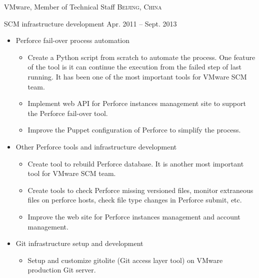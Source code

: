\documentclass[10pt,letterpaper]{article}
\begin{document}
\headedsection
{VMware, Member of Technical Staff}
{\textsc{Beijing, China}}{

\headedsubsection %
{SCM infrastructure development} {Apr. 2011 -- Sept. 2013}
{
    \begin{itemize}
        \item Perforce fail-over process automation
            \begin{itemize}
                \item Create a Python script from scratch to automate the
                    process.
                    One feature of the tool is it can continue the execution
                    from the failed step of last running.
                    It has been one of the most important tools for VMware SCM
                    team.

                \item Implement web API for Perforce instances management site
                    to support the Perforce fail-over tool.

                \item Improve the Puppet configuration of Perforce to simplify
                    the process.
            \end{itemize}
        \item Other Perforce tools and infrastructure development
            \begin{itemize}
                \item Create tool to rebuild Perforce database.
                    It is another most important tool for VMware SCM team. 

                \item Create tools to check Perforce missing versioned files,
                    monitor extraneous files on perforce hosts, check file type
                    changes in Perforce submit, etc.

                \item Improve the web site for Perforce instances management
                    and account management.
            \end{itemize}
        \item Git infrastructure setup and development
            \begin{itemize}
                \item Setup and customize gitolite (Git access layer tool) on
                    VMware production Git server.
                    

\end{itemize}
\end{itemize}}}
\end{document}
